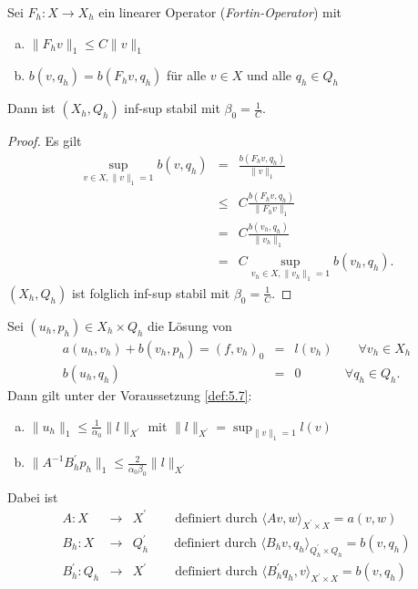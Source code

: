 \begin{Satz}
    \label{satz:5.8}
    Sei $F_h: X \to X_h$ ein linearer Operator
    (\emph{Fortin-Operator}) mit
    \begin{enumerate}[a)]
      \item
        $\|F_h v\|_1 \le C \|v\|_1$
      \item
        $b(v, q_h) = b(F_h v, q_h)$ für alle $v\in X$ und alle $q_h\in Q_h$
    \end{enumerate}
    Dann ist $(X_h, Q_h)$ inf-sup stabil mit $\beta_0 = \frac{1}{C}$.
\end{Satz}


\begin{proof}
    Es gilt
    \begin{eqnarray*}
            \sup_{v\in X, \|v\|_1 = 1} b(v, q_h)
        &=& \frac{b(F_h v, q_h)}{\|v\|_1} \\
        &\le& C \frac{b(F_h v, q_h)}{\|F_h v\|_1} \\
        &=& C \frac{b(v_h, q_h)}{\|v_h\|_1} \\
        &=& C \sup_{v_h\in X, \|v_h\|_1 = 1} b(v_h, q_h).
    \end{eqnarray*}
    $(X_h, Q_h)$ ist folglich inf-sup stabil mit $\beta_0 = \frac{1}{C}$.
\end{proof}


\begin{Satz}[Stabilität]
    \label{satz:5.9}
    Sei $(u_h, p_h)\in X_h \times Q_h$ die Lösung von
    \begin{eqnarray*}
        a(u_h, v_h) + b(v_h, p_h) = (f, v_h)_0 &=& l(v_h)
        \qquad \forall v_h\in X_h \\
        b(u_h, q_h) &=& 0
        \qquad \ \quad \ \forall q_h\in Q_h.
    \end{eqnarray*}
    Dann gilt unter der Voraussetzung \eqref{def:5.7}:
    \begin{enumerate}[a)]
      \item
        $\|u_h\|_1 \le \frac{1}{\alpha_0} \|l\|_{X^\prime}$ mit
        $\|l\|_{X^\prime} = \sup_{\|v\|_1 = 1} l(v)$
      \item
        $\|A^{-1} B_h^\prime p_h\|_1 \le \frac{2}{\alpha_0 \beta_0}
        \|l\|_{X^\prime}$
    \end{enumerate}
    Dabei ist
    \begin{eqnarray*}
        A: X &\to& X^\prime
        \qquad \ \text{definiert durch }
        \langle Av, w \rangle_{X^\prime \times X} = a(v, w) \\
        B_h: X &\to& Q_h^\prime
        \qquad \text{definiert durch }
        \langle B_h v, q_h \rangle_{Q_h^\prime \times Q_h} = b(v, q_h) \\
        B_h^\prime: Q_h &\to& X^\prime
        \qquad \ \text{definiert durch }
        \langle B_h^\prime q_h, v \rangle_{X^\prime \times X} = b(v, q_h)
    \end{eqnarray*}
\end{Satz}


